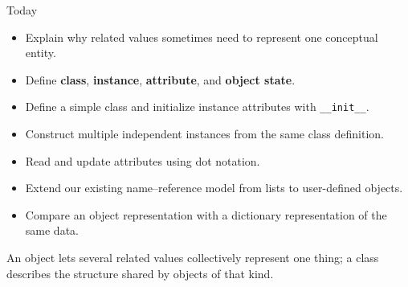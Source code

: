 \documentclass[aspectratio=169,10pt]{beamer}
\begin{document}
\makedecktitle

\begin{frame}{Today}
  \begin{itemize}
    \item Explain why related values sometimes need to represent one conceptual entity.
    \item Define \textbf{class}, \textbf{instance}, \textbf{attribute}, and \textbf{object state}.
    \item Define a simple class and initialize instance attributes with \texttt{\_\_init\_\_}.
    \item Construct multiple independent instances from the same class definition.
    \item Read and update attributes using dot notation.
    \item Extend our existing name--reference model from lists to user-defined objects.
    \item Compare an object representation with a dictionary representation of the same data.
  \end{itemize}

  \begin{keyidea}
    An object lets several related values collectively represent one thing; a class describes the structure shared by objects of that kind.
  \end{keyidea}
\end{frame}
\end{document}
